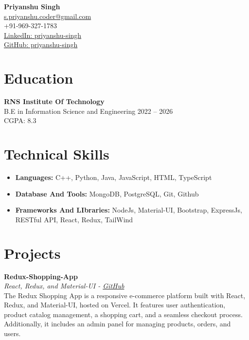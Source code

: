 \documentclass[a4paper,10pt]{article}
\begin{document}
\begin{center}
    {\LARGE \textbf{Priyanshu Singh}} \\
    \href{mailto:s.priyanshu.coder@gmail.com}{s.priyanshu.coder@gmail.com} \\
    +91-969-327-1783 \\
    \href{https://www.linkedin.com/in/priyanshu-singh-b20073257}{LinkedIn: priyanshu-singh} \\
    \href{https://github.com/spriyanshucoder}{GitHub: priyanshu-singh} \\
\end{center}

\section*{Education}
\noindent \textbf{RNS Institute Of Technology} \\
B.E in Information Science and Engineering \hfill 2022 -- 2026 \\
CGPA: 8.3

\section*{Technical Skills}
\begin{itemize}[leftmargin=0.5in]
    \item \textbf{Languages:} C++, Python, Java, JavaScript, HTML, TypeScript
    \item \textbf{Database And Tools:}  MongoDB, PostgreSQL,  Git, Github
    \item \textbf{Frameworks And LIbraries:} NodeJs, Material-UI, Bootstrap, ExpressJs, RESTful API, React, Redux, TailWind
\end{itemize}

\section*{Projects}
\vspace{0.3em}
\textbf{Redux-Shopping-App} \\
\textit{React, Redux, and Material-UI - \href{https://github.com/spriyanshucoder/Redux-Shopping-App}{GitHub}} \\
The Redux Shopping App is a responsive e-commerce platform built with React, Redux, and Material-UI, hosted on Vercel. It features user authentication, product catalog management, a shopping cart, and a seamless checkout process. Additionally, it includes an admin panel for managing products, orders, and users. 
\end{document}
